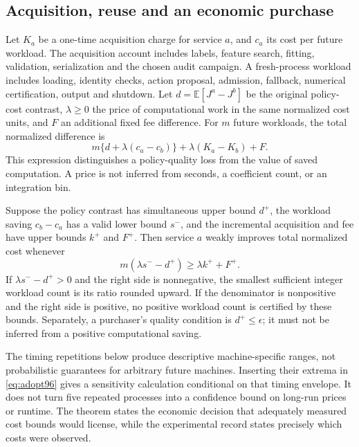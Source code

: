 \subsection{Acquisition, reuse and an economic purchase}
Let $K_a$ be a one-time acquisition charge for service $a$, and $c_a$ its cost per future workload. The acquisition account includes labels, feature search, fitting, validation, serialization and the chosen audit campaign. A fresh-process workload includes loading, identity checks, action proposal, admission, fallback, numerical certification, output and shutdown. Let $d=\mathbb E[J^a-J^b]$ be the original policy-cost contrast, $\lambda\geq0$ the price of computational work in the same normalized cost units, and $F$ an additional fixed fee difference. For $m$ future workloads, the total normalized difference is
\begin{equation}\label{eq:purchase96}
 m\{d+\lambda(c_a-c_b)\}+\lambda(K_a-K_b)+F.
\end{equation}
This expression distinguishes a policy-quality loss from the value of saved computation. A price is not inferred from seconds, a coefficient count, or an integration bin.

\begin{proposition}\label{prop:purchase96}
Suppose the policy contrast has simultaneous upper bound $d^+$, the workload saving $c_b-c_a$ has a valid lower bound $s^-$, and the incremental acquisition and fee have upper bounds $k^+$ and $F^+$. Then service $a$ weakly improves total normalized cost whenever
\begin{equation}\label{eq:adopt96}
 m(\lambda s^- -d^+)\geq\lambda k^++F^+.
\end{equation}
If $\lambda s^- -d^+>0$ and the right side is nonnegative, the smallest sufficient integer workload count is its ratio rounded upward. If the denominator is nonpositive and the right side is positive, no positive workload count is certified by these bounds. Separately, a purchaser's quality condition is $d^+\leq\epsilon$; it must not be inferred from a positive computational saving.
\end{proposition}

The timing repetitions below produce descriptive machine-specific ranges, not probabilistic guarantees for arbitrary future machines. Inserting their extrema in \eqref{eq:adopt96} gives a sensitivity calculation conditional on that timing envelope. It does not turn five repeated processes into a confidence bound on long-run prices or runtime. The theorem states the economic decision that adequately measured cost bounds would license, while the experimental record states precisely which costs were observed.
